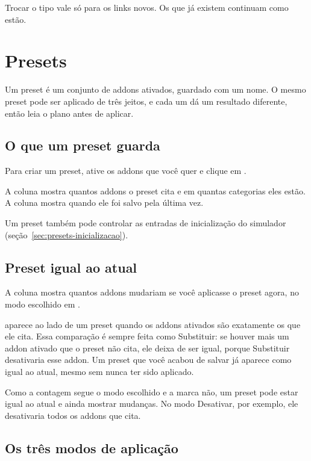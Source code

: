\documentclass[11pt,a4paper]{article}
\begin{document}
Trocar o tipo vale só para os links novos. Os que já existem continuam como
estão.

\section{Presets}

Um preset é um conjunto de addons ativados, guardado com um nome. O mesmo preset
pode ser aplicado de três jeitos, e cada um dá um resultado diferente, então
leia o plano antes de aplicar.

\subsection{O que um preset guarda}

Para criar um preset, ative os addons que você quer e clique em .

A coluna  mostra quantos addons o preset cita e em quantas
categorias eles estão. A coluna  mostra quando ele foi salvo pela
última vez.

Um preset também pode controlar as entradas de inicialização do simulador
(seção~\ref{sec:presets-inicializacao}).

\subsection{Preset igual ao atual}

A coluna  mostra quantos addons mudariam se você aplicasse o
preset agora, no modo escolhido em .

 aparece ao lado de um preset quando os addons ativados são
exatamente os que ele cita. Essa comparação é sempre feita como Substituir: se
houver mais um addon ativado que o preset não cita, ele deixa de ser igual,
porque Substituir desativaria esse addon. Um preset que você acabou de salvar já
aparece como igual ao atual, mesmo sem nunca ter sido aplicado.

Como a contagem segue o modo escolhido e a marca não, um preset pode estar igual
ao atual e ainda mostrar mudanças. No modo Desativar, por exemplo, ele
desativaria todos os addons que cita.

\subsection{Os três modos de aplicação}
\end{document}
